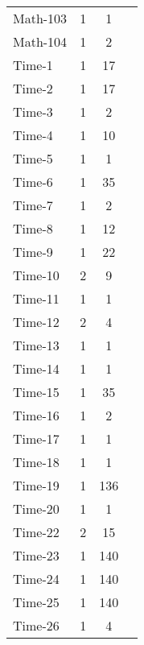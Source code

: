\begin{footnotesize}
\begin{longtable}{lccc}
Math-103 & 1 & 1 & \\
Math-104 & 1 & 2 & \\
Time-1 & 1 & 17 & \\
Time-2 & 1 & 17 & \\
Time-3 & 1 & 2 & \\
Time-4 & 1 & 10 & \\
Time-5 & 1 & 1 & \\
Time-6 & 1 & 35 & \\
Time-7 & 1 & 2 & \\
Time-8 & 1 & 12 & \\
Time-9 & 1 & 22 & \\
Time-10 & 2 & 9 & \\
Time-11 & 1 & 1 & \\
Time-12 & 2 & 4 & \\
Time-13 & 1 & 1 & \\
Time-14 & 1 & 1 & \\
Time-15 & 1 & 35 & \\
Time-16 & 1 & 2 & \\
Time-17 & 1 & 1 & \\
Time-18 & 1 & 1 & \\
Time-19 & 1 & 136 & \\
Time-20 & 1 & 1 & \\
Time-22 & 2 & 15 & \\
Time-23 & 1 & 140 & \\
Time-24 & 1 & 140 & \\
Time-25 & 1 & 140 & \\
Time-26 & 1 & 4 & \\
\bottomrule
\end{longtable}
\end{footnotesize}
